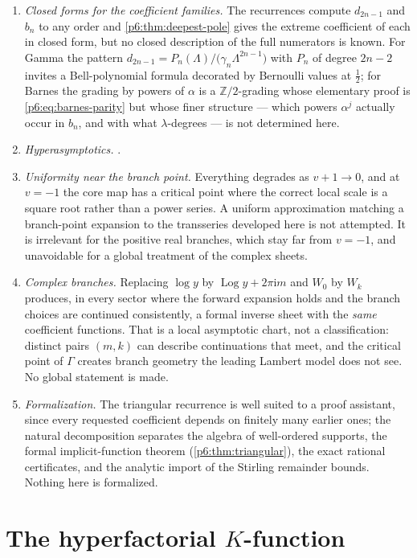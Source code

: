 \documentclass[11pt,a4paper,oneside]{book}
\theoremstyle{plain}
\theoremstyle{definition}
\theoremstyle{remark}
\newcommand{\Int}{\mathbb{Z}}
\newcommand{\ii}{\mathrm{i}}
\newcommand{\Wlam}{W}
\begin{document}
\begin{enumerate}
\item \emph{Closed forms for the coefficient families.}  The recurrences
compute $d_{2n-1}$ and $b_n$ to any order and \cref{p6:thm:deepest-pole}
gives the extreme coefficient of each in closed form, but no closed
description of the full numerators is known.  For Gamma the pattern
$d_{2n-1}=P_n(\Lambda)/\bigl(\gamma_n\Lambda^{2n-1}\bigr)$ with $P_n$ of degree
$2n-2$ invites a Bell-polynomial formula decorated by Bernoulli values at
$\tfrac12$; for Barnes the grading by powers of $\alpha$ is a
$\Int/2$-grading whose elementary proof is \eqref{p6:eq:barnes-parity} but
whose finer structure --- which powers $\alpha^{j}$ actually occur in $b_n$,
and with what $\lambda$-degrees --- is not determined here.
\item \emph{Hyperasymptotics.}  .
\item \emph{Uniformity near the branch point.}  Everything degrades as
$v+1\to0$, and at $v=-1$ the core map has a critical point where the correct
local scale is a square root rather than a power series.  A uniform
approximation matching a branch-point expansion to the transseries developed
here is not attempted.  It is irrelevant for the positive real branches, which
stay far from $v=-1$, and unavoidable for a global treatment of the complex
sheets.
\item \emph{Complex branches.}  Replacing $\log y$ by $\operatorname{Log}y+2\pi\ii m$ and
$\Wlam_0$ by $\Wlam_k$ produces, in every sector where the forward expansion
holds and the branch choices are continued consistently, a formal inverse
sheet with the \emph{same} coefficient functions.  That is a local asymptotic
chart, not a classification: distinct pairs $(m,k)$ can describe continuations
that meet, and the critical point of $\Gamma$ creates branch geometry the
leading Lambert model does not see.  No global statement is made.
\item \emph{Formalization.}  The triangular recurrence is well suited to a
proof assistant, since every requested coefficient depends on finitely many
earlier ones; the natural decomposition separates the algebra of well-ordered
supports, the formal implicit-function theorem
(\cref{p6:thm:triangular}), the exact rational certificates, and the analytic
import of the Stirling remainder bounds.  Nothing here is formalized.
\end{enumerate}

\chapter{The hyperfactorial \texorpdfstring{$K$}{K}-function}
\label{p7:sec:top}
\end{document}
